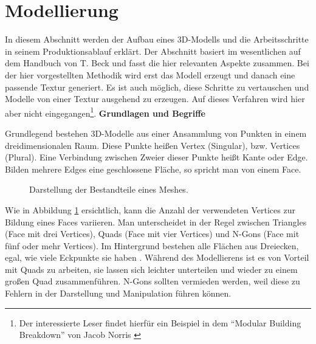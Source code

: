 \section{Modellierung}
In diesem Abschnitt werden der Aufbau eines 3D-Modells und die Arbeitsschritte in seinem Produktionsablauf erklärt. Der Abschnitt basiert im wesentlichen auf dem Handbuch von T. Beck \parencite{blender} und fasst die hier relevanten Aspekte zusammen. Bei der hier vorgestellten Methodik wird erst das Modell erzeugt und danach eine passende Textur generiert. Es ist auch möglich, diese Schritte zu vertauschen und Modelle von einer Textur ausgehend zu erzeugen. Auf dieses Verfahren wird hier aber nicht eingegangen\footnote{Der interessierte Leser findet hierfür ein Beispiel in dem \enquote{Modular Building Breakdown} von Jacob Norris \parencite{Norris}}. 
\textbf{Grundlagen und Begriffe}
\par
Grundlegend bestehen 3D-Modelle aus einer Ansammlung von Punkten in einem dreidimensionalen Raum. Diese Punkte heißen Vertex (Singular), bzw. Vertices (Plural). Eine Verbindung zwischen Zweier dieser Punkte heißt Kante oder Edge. Bilden mehrere Edges eine geschlossene Fläche, so spricht man von einem Face.
\begin{figure}[H]
\centering
  \caption{Darstellung der Bestandteile eines Meshes.}
\label{BlenderCube}
\end{figure}
\vspace{-10.5pt}
Wie in Abbildung \ref{BlenderCube} ersichtlich, kann die Anzahl der verwendeten Vertices zur Bildung eines Faces variieren. Man unterscheidet in der Regel zwischen Triangles (Face mit drei Vertices), Quads (Face mit vier Vertices) und N-Gons (Face mit fünf oder mehr Vertices). Im Hintergrund bestehen alle Flächen aus Dreiecken, egal, wie viele Eckpunkte sie haben \parencite[S.\,82-83]{blender}. Während des Modellierens ist es von Vorteil mit Quads zu arbeiten, sie lassen sich leichter unterteilen und wieder zu einem großen Quad zusammenführen. N-Gons sollten vermieden werden, weil diese zu Fehlern in der Darstellung und Manipulation führen können.

